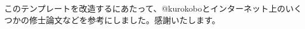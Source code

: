 \begin{acknowledgment}

このテンプレートを改造するにあたって、@kurokoboとインターネット上のいくつかの修士論文などを参考にしました。感謝いたします。

\end{acknowledgment}
